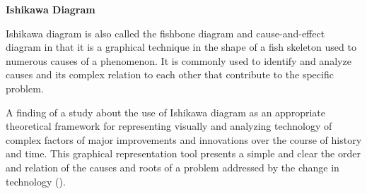 \flushleft
\textbf{Ishikawa Diagram}\\
\justifying

\parx
Ishikawa diagram is also called the fishbone diagram and cause-and-effect diagram in
that it is a graphical technique in the shape of a fish skeleton used to numerous causes
of a phenomenon. It is commonly used to identify and analyze causes and its complex
relation to each other that contribute to the specific problem.

A finding of a study about the use of Ishikawa diagram as an appropriate theoretical
framework for representing visually and analyzing technology of complex factors of
major improvements and innovations over the course of history and time. This graphical
representation tool presents a simple and clear the order and relation of the causes
and roots of a problem addressed by the change in technology
(\cite{coccia_2017}).
